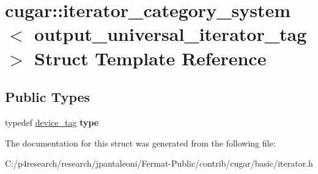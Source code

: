 \hypertarget{structcugar_1_1iterator__category__system_3_01output__universal__iterator__tag_01_4}{}\section{cugar\+:\+:iterator\+\_\+category\+\_\+system$<$ output\+\_\+universal\+\_\+iterator\+\_\+tag $>$ Struct Template Reference}
\label{structcugar_1_1iterator__category__system_3_01output__universal__iterator__tag_01_4}
\subsection*{Public Types}
\begin{DoxyCompactItemize}
\item 
\mbox{\label{structcugar_1_1iterator__category__system_3_01output__universal__iterator__tag_01_4_acfd0c9038f5840f149cf805ac3d312cc}} 
typedef \hyperlink{structcugar_1_1device__tag}{device\+\_\+tag} {\bfseries type}
\end{DoxyCompactItemize}


The documentation for this struct was generated from the following file\+:\begin{DoxyCompactItemize}
\item 
C\+:/p4research/research/jpantaleoni/\+Fermat-\/\+Public/contrib/cugar/basic/iterator.\+h\end{DoxyCompactItemize}
